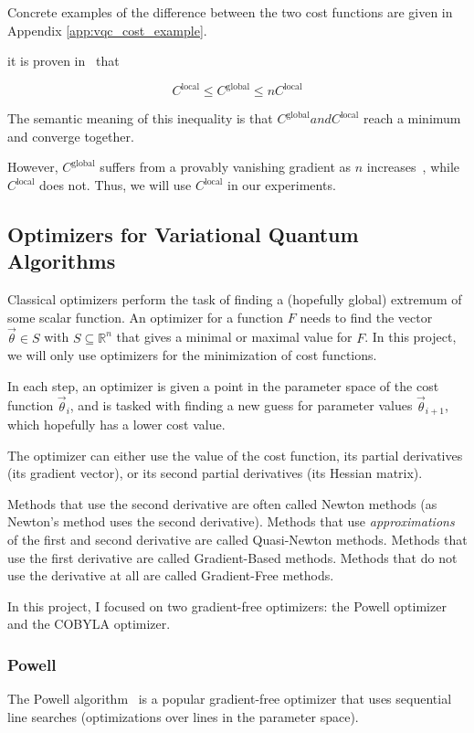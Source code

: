 \documentclass[a4paper,12pt]{article}
\newcommand{\thetas}{\vec{\theta}}
\begin{document}
Concrete examples of the difference between the two cost functions are given in Appendix \ref{app:vqc_cost_example}.


it is proven in~\cite{sharma_noise_2020} that

\begin{equation}
    C^{\textrm{local}} \leq C^{\textrm{global}} \leq nC^{\textrm{local}}
\end{equation} 

The semantic meaning of this inequality is that $C^\textrm{global} and C^\textrm{local}$ reach a minimum and converge together.

However, $C^\textrm{global}$ suffers from a provably vanishing gradient as $n$ increases~\cite{cerezo_cost_2021}, while $C^\textrm{local}$ does not. Thus, we will use $C^\textrm{local}$ in our experiments.

\subsection{Optimizers for Variational Quantum Algorithms} \label{subsec:optimizers}
Classical optimizers perform the task of finding a (hopefully global) extremum of some scalar function.
An optimizer for a function $F$ needs to find the vector $\thetas \in S$ with $S \subseteq \mathbb{R}^n$ that gives a minimal or maximal value for $F$. In this project, we will only use optimizers for the minimization of cost functions.

In each step, an optimizer is given a point in the parameter space of the cost function $\thetas_{i}$, and is tasked with finding a new guess for parameter values $\thetas_{i+1}$, which hopefully has a lower cost value.

The optimizer can either use the value of the cost function, its partial derivatives (its gradient vector), or its second partial derivatives (its Hessian matrix).

Methods that use the second derivative are often called Newton methods (as Newton's method uses the second derivative). Methods that use \emph{approximations} of the first and second derivative are called Quasi-Newton methods.
Methods that use the first derivative are called Gradient-Based methods. Methods that do not use the derivative at all are called Gradient-Free methods.

In this project, I focused on two gradient-free optimizers: the Powell optimizer and the COBYLA optimizer.

\subsubsection{Powell}
The Powell algorithm~\cite{Powell1964} is a popular gradient-free optimizer that uses sequential line searches (optimizations over lines in the parameter space).
\end{document}
